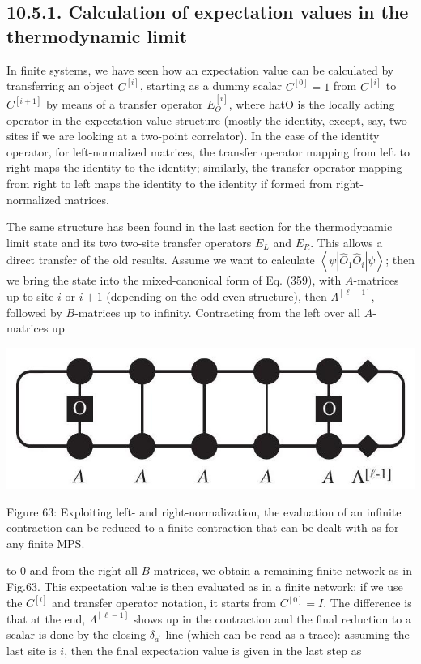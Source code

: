 \documentclass[12pt]{article}
\begin{document}
\subsection*{10.5.1. Calculation of expectation values in the thermodynamic limit}
In finite systems, we have seen how an expectation value can be calculated by transferring an object $C^{[i]}$, starting as a dummy scalar $C^{[0]}=1$ from $C^{[i]}$ to $C^{[i+1]}$ by means of a transfer operator $E_{O}^{[i]}$, where hatO is the locally acting operator in the expectation value structure (mostly the identity, except, say, two sites if we are looking at a two-point correlator). In the case of the identity operator, for left-normalized matrices, the transfer operator mapping from left to right maps the identity to the identity; similarly, the transfer operator mapping from right to left maps the identity to the identity if formed from right-normalized matrices.

The same structure has been found in the last section for the thermodynamic limit state and its two two-site transfer operators $E_{L}$ and $E_{R}$. This allows a direct transfer of the old results. Assume we want to calculate $\left\langle\psi\left|\hat{O}_{1} \hat{O}_{i}\right| \psi\right\rangle$; then we bring the state into the mixed-canonical form of Eq. (359), with $A$-matrices up to site $i$ or $i+1$ (depending on the odd-even structure), then $\Lambda^{[\ell-1]}$, followed by $B$-matrices up to infinity. Contracting from the left over all $A$-matrices up

\begin{center}
\includegraphics[max width=\textwidth]{2024_05_04_afc4ad226da9ccfe0ac8g-114}
\end{center}

Figure 63: Exploiting left- and right-normalization, the evaluation of an infinite contraction can be reduced to a finite contraction that can be dealt with as for any finite MPS.

to 0 and from the right all $B$-matrices, we obtain a remaining finite network as in Fig.63. This expectation value is then evaluated as in a finite network; if we use the $C^{[i]}$ and transfer operator notation, it starts from $C^{[0]}=I$. The difference is that at the end, $\Lambda^{[\ell-1]}$ shows up in the contraction and the final reduction to a scalar is done by the closing $\delta_{a^{\prime}}$ line (which can be read as a trace): assuming the last site is $i$, then the final expectation value is given in the last step as
\end{document}
